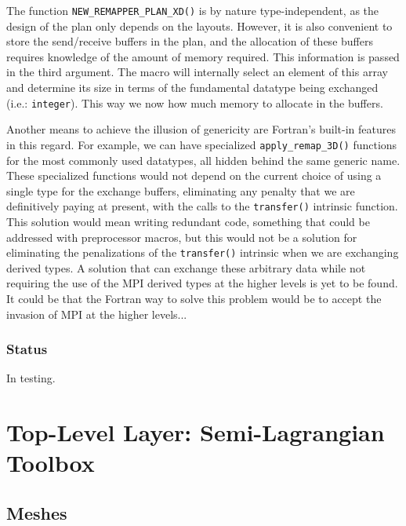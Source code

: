 \documentclass[]{report}   %
\begin{document}
The function \verb+NEW_REMAPPER_PLAN_XD()+ is by nature type-independent, as the design of the plan only depends on the layouts. However, it is also convenient to store the send/receive buffers in the plan, and the allocation of these buffers requires knowledge of the amount of memory required. This information is passed in the third argument. The macro will internally select an element of this array and determine its size in terms of the fundamental datatype being exchanged (i.e.: \verb+integer+). This way we now how much memory to allocate in the buffers.

Another means to achieve the illusion of genericity are Fortran's built-in features in this regard. For example, we can have specialized \verb+apply_remap_3D()+ functions for the most commonly used datatypes, all hidden behind the same generic name. These specialized functions would not depend on the current choice of using a single type for the exchange buffers, eliminating any penalty that we are definitively paying at present, with the calls to the \verb+transfer()+ intrinsic function. This solution would mean writing redundant code, something that could be addressed with preprocessor macros, but this would not be a solution for eliminating the penalizations of the \verb+transfer()+ intrinsic when we are exchanging derived types. A solution that can exchange these arbitrary data while not requiring the use of the MPI derived types at the higher levels is yet to be found. It could be that the Fortran way to solve this problem would be to accept the invasion of MPI at the higher levels...

\subsection{Status}

In testing.

\chapter{Top-Level Layer: Semi-Lagrangian Toolbox}

\section{Meshes}
\end{document}
